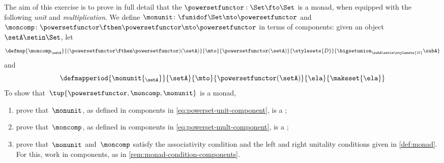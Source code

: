 

\begin{gradedexercise}
    \label{ex:PowersetMonad}
    The aim of this exercise is to prove in full detail that the   $\powersetfunctor : \Set \fto \Set$ is a monad, when equipped with the following \emph{unit} and \emph{multiplication}.
    We define $\monunit \colon \funidof\Set \nto \powersetfunctor$ and $\moncomp \colon \powersetfunctor \fthen \powersetfunctor \nto \powersetfunctor$ in terms of components: given an object $\setA \setin \Set$, let
    \begin{equation}
        \label{eq:powerset-mult-component}
        \defmap{\moncomp_{\setA}}{(\powersetfunctor \fthen \powersetfunctor)(\setA)}{\mto}{\powersetfunctor(\setA)}{\stylesets{D}}{\bigsetunion_{\subA \setin \stylesets{D}} \subA}
    \end{equation}
    and
    \begin{equation}
        \label{eq:powerset-unit-component}
        \defmapperiod{\monunit{_\setA}}{\setA}{\mto}{\powersetfunctor(\setA)}{\ela}{\makeset{ \ela }}
    \end{equation}
    To show that~$\tup{\powersetfunctor, \moncomp, \monunit}$ is a monad,
    \begin{enumerate}
        \item prove that~$\monunit$, as defined in components in \cref{eq:powerset-unit-component}, is a ;
        \item prove that~$\moncomp$, as defined in components in \cref{eq:powerset-mult-component}, is a ;
        \item prove that~$\monunit$ and~$\moncomp$ satisfy the associativity condition and the left and right unitality conditions given in \cref{def:monad}.
              For this, work in components, as in \cref{rem:monad-condition-components}.
    \end{enumerate}
\end{gradedexercise}


